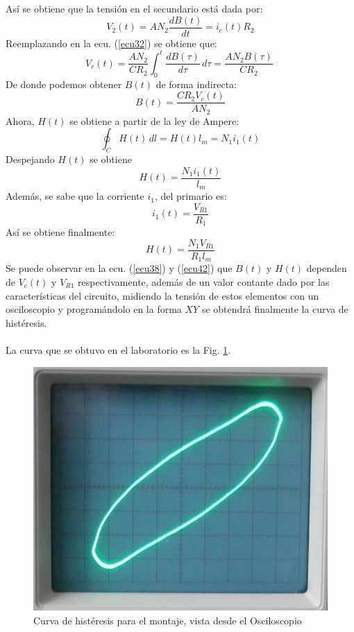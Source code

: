 \documentclass[twocolumn]{IEEEtran}
\begin{document}
\noindent
Así se obtiene que la tensión en el secundario está dada por:
\begin{equation}
V_2(t)=AN_2\frac{dB(t)}{dt}=i_c(t)R_2
\label{ecu36}
\end{equation}
\noindent
Reemplazando en la ecu. (\ref{ecu32}) se obtiene que:
\begin{equation}
V_c(t)=\frac{AN_2}{CR_2}\displaystyle\int_{0}^{t} \frac{dB(\tau)}{d\tau}\, d\tau=\frac{AN_2B(\tau)}{CR_2}\
\label{ecu37}
\end{equation}
\noindent
De donde podemos obtener $B(t)$ de forma indirecta:
\begin{equation}
B(t)=\frac{CR_2 V_c(t)}{AN_2}
\label{ecu38}
\end{equation}
\noindent
Ahora, $H(t)$ se obtiene a partir de la ley de Ampere:
\begin{equation}
\displaystyle\oint_{C} H(t)\, dl=H(t)l_m=N_1i_1(t)
\label{ecu39}
\end{equation}
\noindent
Despejando $H(t)$ se obtiene
\begin{equation}
H(t)=\frac{N_1i_1(t)}{l_m}
\label{ecu40}
\end{equation}
\noindent
Además, se sabe que la corriente  $i_1$, del primario es:
\begin{equation}
i_1(t)=\frac{V_{R1}}{R_1}
\label{ecu41}
\end{equation}
\noindent
Así se obtiene finalmente:
\begin{equation}
H(t)=\frac{N_1V_{R1}}{R_1l_m}
\label{ecu42}
\end{equation}
\noindent
Se puede observar en la ecu. (\ref{ecu38}) y (\ref{ecu42}) que $B(t)$ y $H(t)$ dependen de $V_c(t)$ y $V_{R1}$ respectivamente, además de un valor contante dado por las características del circuito, midiendo la tensión de estos elementos con un osciloscopio y programándolo en la forma $XY$ se obtendrá finalmente la curva de histéresis.\\\\
La curva que se obtuvo en el laboratorio es la Fig. \ref{fig22}.
\begin{figure}[H]
	\centering
		\includegraphics[scale=0.3]{445.png}
	\caption{Curva de histéresis para el montaje, vista desde el Osciloscopio}
	\label{fig22}
\end{figure}
\end{document}
